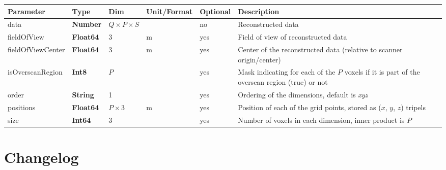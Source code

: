 \documentclass[landscape,a4paper]{article} %
\newcommand{\inltab}[1]{{\ttfamily\bfseries\color{blue}#1}}
\newcommand{\inlvar}[1]{{\ttfamily#1}}
\begin{document}
\noindent \begin{tabularx}{\columnwidth}{lllllX} 
\textbf{Parameter} & \textbf{Type} & \textbf{Dim} & \textbf{Unit/Format} & \textbf{Optional} & \textbf{Description} \\ \hline 
\inlvar{data} & \inltab{Number} & $Q\times P \times S$ & & no & Reconstructed data \\ \hline
\inlvar{fieldOfView} & \inltab{Float64} & $3$ & m & yes & Field of view of reconstructed data \\ \hline
\inlvar{fieldOfViewCenter} & \inltab{Float64} & $3$ & m & yes & Center of the reconstructed data (relative to scanner origin/center) \\ \hline 
\inlvar{isOverscanRegion} & \inltab{Int8} & $P$ &  & yes & Mask indicating for each of the $P$ voxels if it is part of the overscan region (true) or not \\ \hline
\inlvar{order} & \inltab{String} & 1 & & yes & Ordering of the dimensions, default is \textit{xyz} \\ \hline
\inlvar{positions} & \inltab{Float64} & $P \times 3$ & m & yes & Position of each of the grid points, stored as ($x$, $y$, $z$) tripels \\ \hline
\inlvar{size} & \inltab{Int64} & $3$ &  & yes & Number of voxels in each dimension, inner product is $P$ \\ \hline
\end{tabularx}


\clearpage
\section{Changelog}
\end{document}
